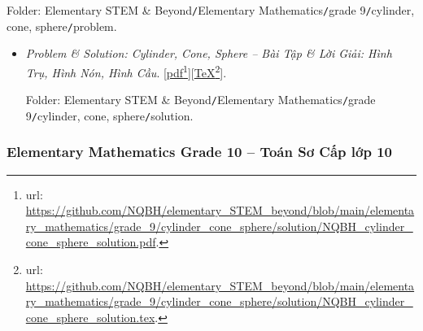 \documentclass[12pt,oneside]{book}
\begin{document}
\begin{enumerate}
\begin{center}
	\end{center}
	Folder: {\sf Elementary STEM \& Beyond{\tt/}Elementary Mathematics{\tt/}grade 9{\tt/}cylinder, cone, sphere{\tt/}problem}.
	\begin{itemize}
		\item  {\it Problem \& Solution: Cylinder, Cone, Sphere -- Bài Tập \& Lời Giải: Hình Trụ, Hình Nón, Hình Cầu}. [\href{https://github.com/NQBH/elementary_STEM_beyond/blob/main/elementary_mathematics/grade_9/cylinder_cone_sphere/solution/NQBH_cylinder_cone_sphere_solution.pdf}{pdf}\footnote{{\sc url}: \url{https://github.com/NQBH/elementary_STEM_beyond/blob/main/elementary_mathematics/grade_9/cylinder_cone_sphere/solution/NQBH_cylinder_cone_sphere_solution.pdf}.}][\href{https://github.com/NQBH/elementary_STEM_beyond/blob/main/elementary_mathematics/grade_9/cylinder_cone_sphere/solution/NQBH_cylinder_cone_sphere_solution.tex}{\TeX}\footnote{{\sc url}: \url{https://github.com/NQBH/elementary_STEM_beyond/blob/main/elementary_mathematics/grade_9/cylinder_cone_sphere/solution/NQBH_cylinder_cone_sphere_solution.tex}.}].
		
		Folder: {\sf Elementary STEM \& Beyond{\tt/}Elementary Mathematics{\tt/}grade 9{\tt/}cylinder, cone, sphere{\tt/}solution}.
	\end{itemize}
\end{enumerate}

\subsubsection{Elementary Mathematics Grade 10 -- Toán Sơ Cấp lớp 10}
\label{sect: emath10}
\end{document}
